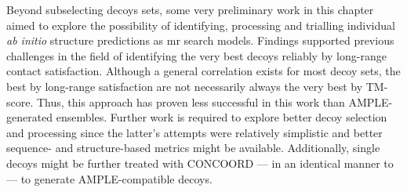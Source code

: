 Beyond subselecting decoys sets, some very preliminary work in this chapter aimed to explore the possibility of identifying, processing and trialling individual \textit{ab initio} structure predictions as \gls{mr} search models. Findings supported previous challenges in the field of identifying the very best decoys reliably by long-range contact satisfaction. Although a general correlation exists for most decoy sets, the best by long-range satisfaction are not necessarily always the very best by TM-score. Thus, this approach has proven less successful in this work than AMPLE-generated ensembles. Further work is required to explore better decoy selection and processing since the latter's attempts were relatively simplistic and better sequence- and structure-based metrics might be available. Additionally, single decoys might be further treated with CONCOORD --- in an identical manner to \textcite{Rigden2018-zt} --- to generate AMPLE-compatible decoys.
